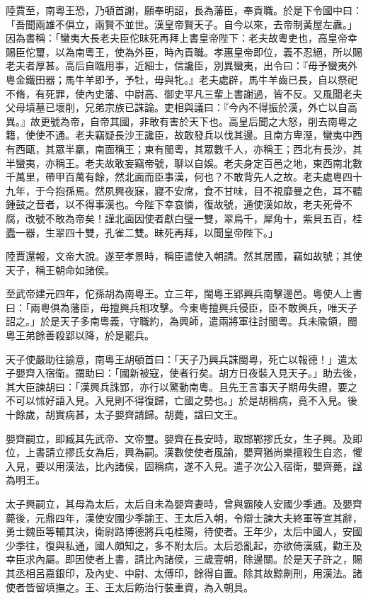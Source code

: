 \begin{pinyinscope}
陸賈至，南粵王恐，乃頓首謝，願奉明詔，長為藩臣，奉貢職。於是下令國中曰：「吾聞兩雄不俱立，兩賢不並世。漢皇帝賢天子。自今以來，去帝制黃屋左纛。」因為書稱：「蠻夷大長老夫臣佗昧死再拜上書皇帝陛下：老夫故粵吏也，高皇帝幸賜臣佗璽，以為南粵王，使為外臣，時內貢職。孝惠皇帝即位，義不忍絕，所以賜老夫者厚甚。高后自臨用事，近細士，信讒臣，別異蠻夷，出令曰：『毋予蠻夷外粵金鐵田器；馬牛羊即予，予牡，毋與牝。』老夫處辟，馬牛羊齒已長，自以祭祀不脩，有死罪，使內史藩、中尉高、御史平凡三輩上書謝過，皆不反。又風聞老夫父母墳墓已壞削，兄弟宗族已誅論。吏相與議曰：『今內不得振於漢，外亡以自高異。』故更號為帝，自帝其國，非敢有害於天下也。高皇后聞之大怒，削去南粵之籍，使使不通。老夫竊疑長沙王讒臣，故敢發兵以伐其邊。且南方卑溼，蠻夷中西有西甌，其眾半羸，南面稱王；東有閩粵，其眾數千人，亦稱王；西北有長沙，其半蠻夷，亦稱王。老夫故敢妄竊帝號，聊以自娛。老夫身定百邑之地，東西南北數千萬里，帶甲百萬有餘，然北面而臣事漢，何也？不敢背先人之故。老夫處粵四十九年，于今抱孫焉。然夙興夜寐，寢不安席，食不甘味，目不視靡曼之色，耳不聽鍾鼓之音者，以不得事漢也。今陛下幸哀憐，復故號，通使漢如故，老夫死骨不腐，改號不敢為帝矣！謹北面因使者獻白璧一雙，翠鳥千，犀角十，紫貝五百，桂蠹一器，生翠四十雙，孔雀二雙。昧死再拜，以聞皇帝陛下。」

陸賈還報，文帝大說。遂至孝景時，稱臣遣使入朝請。然其居國，竊如故號；其使天子，稱王朝命如諸侯。

至武帝建元四年，佗孫胡為南粵王。立三年，閩粵王郢興兵南擊邊邑。粵使人上書曰：「兩粵俱為藩臣，毋擅興兵相攻擊。今東粵擅興兵侵臣，臣不敢興兵，唯天子詔之。」於是天子多南粵義，守職約，為興師，遣兩將軍往討閩粵。兵未隃領，閩粵王弟餘善殺郢以降，於是罷兵。

天子使嚴助往諭意，南粵王胡頓首曰：「天子乃興兵誅閩粵，死亡以報德！」遣太子嬰齊入宿衛。謂助曰：「國新被寇，使者行矣。胡方日夜裝入見天子。」助去後，其大臣諫胡曰：「漢興兵誅郢，亦行以驚動南粵。且先王言事天子期毋失禮，要之不可以怵好語入見。入見則不得復歸，亡國之勢也。」於是胡稱病，竟不入見。後十餘歲，胡實病甚，太子嬰齊請歸。胡薨，諡曰文王。

嬰齊嗣立，即臧其先武帝、文帝璽。嬰齊在長安時，取邯鄲摎氏女，生子興。及即位，上書請立摎氏女為后，興為嗣。漢數使使者風諭，嬰齊猶尚樂擅殺生自恣，懼入見，要以用漢法，比內諸侯，固稱病，遂不入見。遣子次公入宿衛，嬰齊薨，諡為明王。

太子興嗣立，其母為太后，太后自未為嬰齊妻時，曾與霸陵人安國少季通。及嬰齊薨後，元鼎四年，漢使安國少季諭王、王太后入朝，令辯士諫大夫終軍等宣其辭，勇士魏臣等輔其決，衛尉路博德將兵屯桂陽，待使者。王年少，太后中國人，安國少季往，復與私通，國人頗知之，多不附太后。太后恐亂起，亦欲倚漢威，勸王及幸臣求內屬。即因使者上書，請比內諸侯，三歲壹朝，除邊關。於是天子許之，賜其丞相呂嘉銀印，及內史、中尉、太傅印，餘得自置。除其故黥劓刑，用漢法。諸使者皆留填撫之。王、王太后飭治行裝重資，為入朝具。


\end{pinyinscope}
